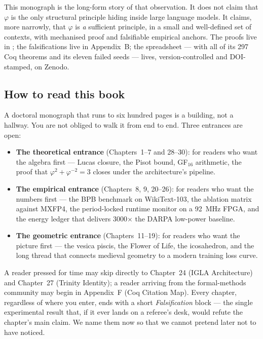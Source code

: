 This monograph is the long-form story of that observation. It does
not claim that \(\varphi\) is the only structural principle hiding
inside large language models. It claims, more narrowly, that \(\varphi\)
is \emph{a} sufficient principle, in a small and well-defined set of
contexts, with mechanised proof and falsifiable empirical anchors. The
proofs live in ; the falsifications
live in Appendix~B; the spreadsheet --- with all of its 297 Coq theorems
and its eleven failed seeds --- lives, version-controlled and
DOI-stamped, on Zenodo.

\subsection*{How to read this book}

A doctoral monograph that runs to six hundred pages is a building, not
a hallway. You are not obliged to walk it from end to end. Three
entrances are open:

\begin{itemize}
\item \textbf{The theoretical entrance} (Chapters~1--7 and 28--30):
for readers who want the algebra first --- Lucas closure, the Pisot
bound, GF\(_{16}\) arithmetic, the proof that \(\varphi^{2} +
\varphi^{-2} = 3\) closes under the architecture's pipeline.

\item \textbf{The empirical entrance} (Chapters~8, 9, 20--26):
for readers who want the numbers first --- the BPB benchmark on
WikiText-103, the ablation matrix against MXFP4, the period-locked
runtime monitor on a 92~MHz FPGA, and the energy ledger that delivers
3000\(\times\) the DARPA low-power baseline.

\item \textbf{The geometric entrance} (Chapters~11--19): for readers
who want the picture first --- the vesica piscis, the Flower of Life,
the icosahedron, and the long thread that connects medieval geometry
to a modern training loss curve.

\end{itemize}

A reader pressed for time may skip directly to Chapter~24 (IGLA
Architecture) and Chapter~27 (Trinity Identity); a reader arriving
from the formal-methods community may begin in Appendix~F (Coq
Citation Map). Every chapter, regardless of where you enter, ends with
a short \emph{Falsification} block --- the single experimental result
that, if it ever lands on a referee's desk, would refute the chapter's
main claim. We name them now so that we cannot pretend later not to
have noticed.

